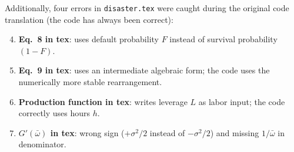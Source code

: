 \documentclass[11pt]{article}
\begin{document}
Additionally, four errors in \texttt{disaster.tex} were caught during
the original code translation (the code has always been correct):

\begin{enumerate}
\setcounter{enumi}{3}
\item \textbf{Eq.~8 in tex}: uses default probability $F$ instead of
  survival probability $(1-F)$.

\item \textbf{Eq.~9 in tex}: uses an intermediate algebraic form; the
  code uses the numerically more stable rearrangement.

\item \textbf{Production function in tex}: writes leverage $L$ as labor
  input; the code correctly uses hours $h$.

\item \textbf{$G'(\bar\omega)$ in tex}: wrong sign ($+\sigma^2/2$
  instead of $-\sigma^2/2$) and missing $1/\bar\omega$ in denominator.
\end{enumerate}
\end{document}
